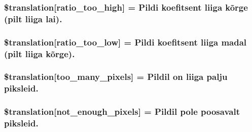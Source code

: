 \subsubsection[{\$translation}]{\setlength{\rightskip}{0pt plus 5cm}\$translation\mbox{[}\textquotesingle{}ratio\+\_\+too\+\_\+high\textquotesingle{}\mbox{]} = \textquotesingle{}Pildi koefitsent liiga kõrge (pilt liiga lai).\textquotesingle{}}\label{class_8upload_8et___e_e_8php_a23396f6ce7f31e5e5f1b57580621d982}
\hypertarget{class_8upload_8et___e_e_8php_ac533b9a479f056b0b8623e4268f068c2}{}
\subsubsection[{\$translation}]{\setlength{\rightskip}{0pt plus 5cm}\$translation\mbox{[}\textquotesingle{}ratio\+\_\+too\+\_\+low\textquotesingle{}\mbox{]} = \textquotesingle{}Pildi koefitsent liiga madal (pilt liiga kõrge).\textquotesingle{}}\label{class_8upload_8et___e_e_8php_ac533b9a479f056b0b8623e4268f068c2}
\hypertarget{class_8upload_8et___e_e_8php_aa4051ef64e94a3f8295c63cf85544016}{}
\subsubsection[{\$translation}]{\setlength{\rightskip}{0pt plus 5cm}\$translation\mbox{[}\textquotesingle{}too\+\_\+many\+\_\+pixels\textquotesingle{}\mbox{]} = \textquotesingle{}Pildil on liiga palju piksleid.\textquotesingle{}}\label{class_8upload_8et___e_e_8php_aa4051ef64e94a3f8295c63cf85544016}
\hypertarget{class_8upload_8et___e_e_8php_a1fe342c27ce61f4ff4e0120ba647033e}{}
\subsubsection[{\$translation}]{\setlength{\rightskip}{0pt plus 5cm}\$translation\mbox{[}\textquotesingle{}not\+\_\+enough\+\_\+pixels\textquotesingle{}\mbox{]} = \textquotesingle{}Pildil pole poosavalt piksleid.\textquotesingle{}}\label{class_8upload_8et___e_e_8php_a1fe342c27ce61f4ff4e0120ba647033e}
\hypertarget{class_8upload_8et___e_e_8php_a4ce76e7be0b3a03c2b47f6d70c21832e}{}
